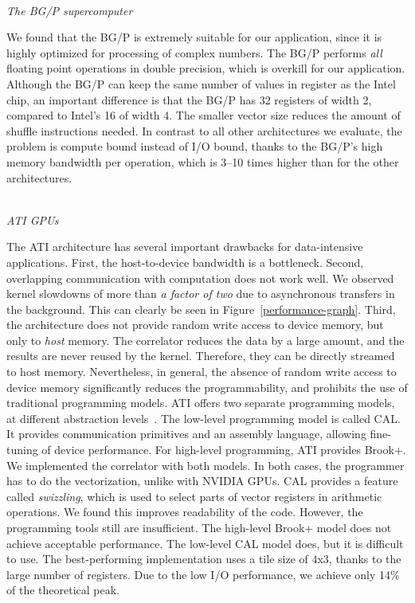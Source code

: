 \documentclass{article}
\begin{document}
\noindent \\ \emph{The BG/P supercomputer}

\noindent 
We found that the BG/P is extremely suitable for our application,
since it is highly optimized for processing of complex numbers.
The BG/P performs \emph{all} floating point operations in double
precision, which is overkill for our application.
Although the BG/P can keep the same number of values in register as the 
Intel chip, an important difference is that the BG/P has 32
registers of width 2, compared to Intel's 16 of width 4.  The smaller
vector size reduces the amount of shuffle instructions needed.
In contrast to all other architectures we evaluate, the problem is compute
bound instead of I/O bound, thanks to the BG/P's high memory bandwidth per
operation, which is 3--10 times higher than for the other architectures.


\noindent \\ \emph{ATI GPUs}

\noindent The ATI architecture has several important
drawbacks for data-intensive applications.  First, the
host-to-device bandwidth is a bottleneck.  Second, 
overlapping communication with computation does not work well.
We observed kernel slowdowns of more than \emph{a factor of
two} due to asynchronous transfers in the background. This can clearly be seen in Figure~\ref{performance-graph}.
Third, the architecture does not provide random write access to device
memory, but only to \emph{host} memory.
The correlator reduces the data by a large amount, and the
results are never reused by the kernel. Therefore, they can be
directly streamed to host memory. Nevertheless, in general, the absence of random
write access to device memory significantly reduces the programmability, and prohibits the use
of traditional programming models.
ATI offers two separate programming models, at different abstraction
levels~\cite{amd-manual}.  The low-level programming model is called CAL.  
It provides communication primitives and
an assembly language, allowing fine-tuning of device
performance. For high-level programming, ATI provides Brook+.  We
implemented the correlator with both models.
In both cases, the programmer has to do the vectorization,
unlike with NVIDIA GPUs.  CAL provides a feature called
\emph{swizzling}, which is used to select parts of vector registers in
arithmetic operations.  We found this improves readability of the code. 
However, the
programming tools still are insufficient. The high-level Brook+ model does
not achieve acceptable performance. The low-level
CAL model does, but it is difficult to use.
The best-performing implementation uses a tile size of 4x3, thanks to
the large number of registers.  
Due to the low I/O performance, we achieve only 14\% of the theoretical peak.
\end{document}
